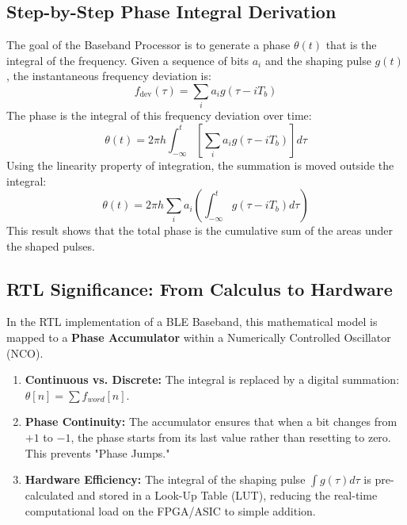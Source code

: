\documentclass[12pt]{article}
\begin{document}
\subsection{Step-by-Step Phase Integral Derivation}
The goal of the Baseband Processor is to generate a phase $\theta(t)$ that is the integral of the frequency. Given a sequence of bits $a_i$ and the shaping pulse $g(t)$, the instantaneous frequency deviation is:
\begin{equation}
f_{\text{dev}}(\tau) = \sum_{i} a_i g(\tau - iT_b)
\end{equation}
The phase is the integral of this frequency deviation over time:
\begin{equation}
\theta(t) = 2\pi h \int_{-\infty}^{t} \left[ \sum_{i} a_i g(\tau - iT_b) \right] d\tau
\end{equation}
Using the linearity property of integration, the summation is moved outside the integral:
\begin{equation}
\theta(t) = 2\pi h \sum_{i} a_i \left( \int_{-\infty}^{t} g(\tau - iT_b) d\tau \right)
\end{equation}
This result shows that the total phase is the cumulative sum of the areas under the shaped pulses.

\subsection{RTL Significance: From Calculus to Hardware}
In the RTL implementation of a BLE Baseband, this mathematical model is mapped to a \textbf{Phase Accumulator} within a Numerically Controlled Oscillator (NCO).
\begin{enumerate}
    \item \textbf{Continuous vs. Discrete:} The integral is replaced by a digital summation: $\theta[n] = \sum f_{word}[n]$.
    \item \textbf{Phase Continuity:} The accumulator ensures that when a bit changes from $+1$ to $-1$, the phase starts from its last value rather than resetting to zero. This prevents "Phase Jumps."
    \item \textbf{Hardware Efficiency:} The integral of the shaping pulse $\int g(\tau) d\tau$ is pre-calculated and stored in a Look-Up Table (LUT), reducing the real-time computational load on the FPGA/ASIC to simple addition.
\end{enumerate}
\end{document}
